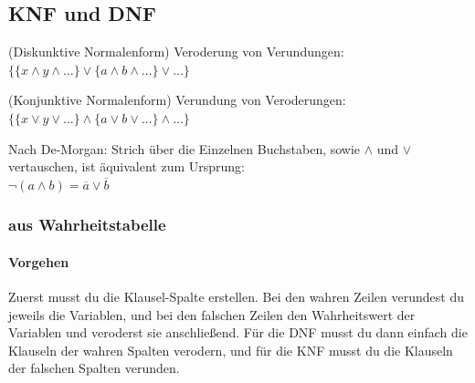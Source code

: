 \documentclass[
    ngerman,
    color=3b,
    summary,
    boxarc,
    main,
    fleqn,
    leqno,
]{rubos-tuda-template}
\begin{document}
    \subsection{KNF und DNF}
    \begin{definition}[DNF]\label{dnf} (Diskunktive Normalenform)
        Veroderung von Verundungen: $\{\{x\land y\land\dots\}\lor\{a\land b\land\dots\}\lor\dots\}$
    \end{definition}
    \begin{definition}[KNF]\label{knf} (Konjunktive Normalenform)
        Verundung von Veroderungen: $\{\{x\lor y\lor\dots\}\land\{a\lor b\lor\dots\}\land\dots\}$
    \end{definition}
    \begin{tipp}
        Nach De-Morgan: Strich über die Einzelnen Buchstaben, sowie $\land$ und $\lor$ vertauschen, ist äquivalent zum Ursprung:\\
        $\neg(a\land b) = \overline{a}\lor \overline{b}$
    \end{tipp}
    \subsubsection{aus Wahrheitstabelle}
    \paragraph{Vorgehen} Zuerst musst du die Klausel-Spalte erstellen.
    Bei den wahren Zeilen verundest du jeweils die Variablen, und bei den falschen Zeilen  den Wahrheitswert der Variablen und veroderst sie anschließend. Für die \textcolor{dnfcolor}{DNF} musst du dann einfach die Klauseln der wahren Spalten \textcolor{dnfcolor}{verodern}, und für die \textcolor{knfcolor}{KNF} musst du die Klauseln der falschen Spalten \textcolor{knfcolor}{verunden}.
\end{document}

